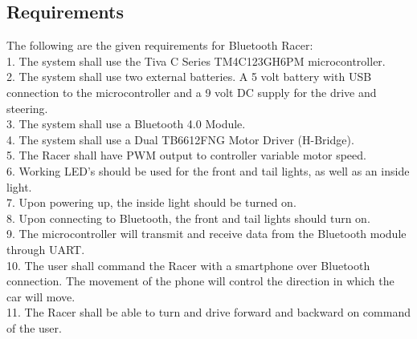 \documentclass[12pt]{article}
\begin{document}
\subsection{Requirements}
The following are the given requirements for Bluetooth Racer:\\
1. The system shall use the Tiva C Series TM4C123GH6PM microcontroller.\\
2. The system shall use two external batteries. A 5 volt battery with USB connection to the microcontroller and a 9 volt DC supply for the drive and steering.\\
3. The system shall use a Bluetooth 4.0 Module.\\
4. The system shall use a Dual TB6612FNG Motor Driver (H-Bridge).\\
5. The Racer shall have PWM output to controller variable motor speed.\\
6. Working LED’s should be used for the front and tail lights, as well as an inside light.\\
7. Upon powering up, the inside light should be turned on. \\
8. Upon connecting to Bluetooth, the front and tail lights should turn on. \\
9. The microcontroller will transmit and receive data from the Bluetooth module through UART.\\
10. The user shall command the Racer with a smartphone over Bluetooth connection. The movement of the phone will control the direction in which the car will move.\\
11. The Racer shall be able to turn and drive forward and backward on command of the user.\\
\end{document}
